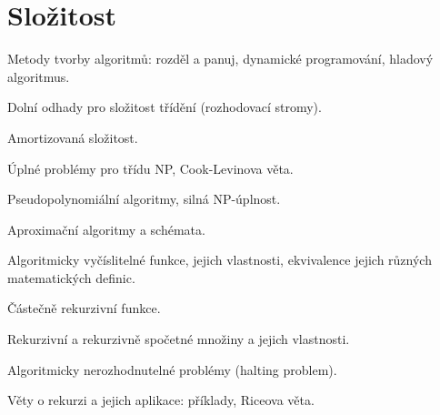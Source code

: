 \newpage
\section{Složitost}
\begin{pozadavky}
\begin{pitemize}
\item Metody tvorby algoritmů: rozděl a panuj, dynamické programování, hladový algoritmus.
\item Dolní odhady pro složitost třídění (rozhodovací stromy). 
\item Amortizovaná složitost. 
\item Úplné problémy pro třídu NP, Cook-Levinova věta.
\item Pseudopolynomiální algoritmy, silná NP-úplnost.
\item Aproximační algoritmy a schémata. 
\item Algoritmicky vyčíslitelné funkce, jejich vlastnosti, ekvivalence jejich různých matematických definic. 
\item Částečně rekurzivní funkce. 
\item Rekurzivní a rekurzivně spočetné množiny a jejich vlastnosti. 
\item Algoritmicky nerozhodnutelné problémy (halting problem). 
\item Věty o rekurzi a jejich aplikace: příklady, Riceova věta.
\end{pitemize}
\end{pozadavky}









